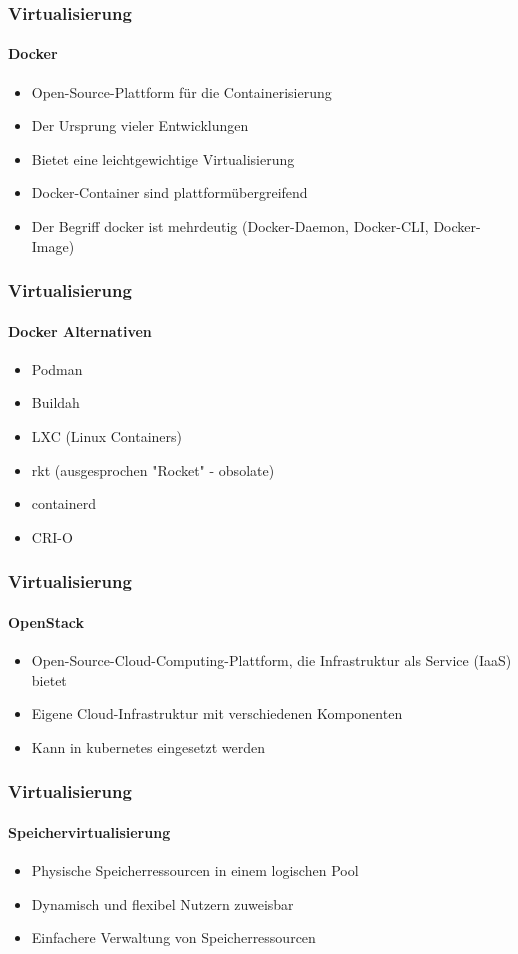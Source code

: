 \begin{frame}
  \frametitle{Virtualisierung}
  \framesubtitle{Docker}
  \begin{itemize}
    \item Open-Source-Plattform für die Containerisierung
    \item Der Ursprung vieler Entwicklungen
    \item Bietet eine leichtgewichtige Virtualisierung
    \item Docker-Container sind plattformübergreifend
    \item Der Begriff docker ist mehrdeutig (Docker-Daemon, Docker-CLI, Docker-Image)
  \end{itemize}
\end{frame}

\begin{frame}
  \frametitle{Virtualisierung}
  \framesubtitle{Docker Alternativen}
  \begin{itemize}
    \item Podman
    \item Buildah
    \item LXC (Linux Containers)
    \item rkt (ausgesprochen "Rocket" - obsolate) 
    \item containerd
    \item CRI-O
  \end{itemize}
\end{frame}

\begin{frame}
  \frametitle{Virtualisierung}
  \framesubtitle{OpenStack}
  \begin{itemize}
    \item Open-Source-Cloud-Computing-Plattform, die Infrastruktur als Service (IaaS) bietet
    \item Eigene Cloud-Infrastruktur mit verschiedenen Komponenten
    \item Kann in kubernetes eingesetzt werden
  \end{itemize}
\end{frame}

\begin{frame}
  \frametitle{Virtualisierung}
  \framesubtitle{Speichervirtualisierung}
  \begin{itemize}
    \item Physische Speicherressourcen in einem logischen Pool 
    \item Dynamisch und flexibel Nutzern zuweisbar
    \item Einfachere Verwaltung von Speicherressourcen 
  \end{itemize}
\end{frame}

